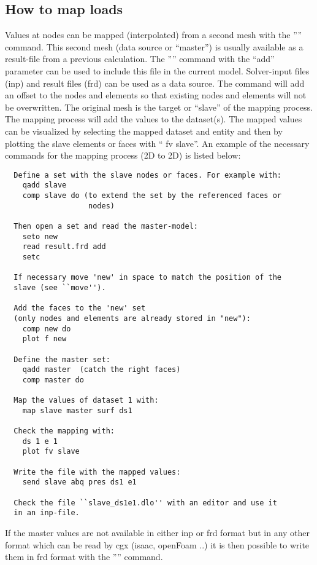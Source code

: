 \documentclass{article}
\begin{document}
\begin{appendix}
\subsection{\label{How to map loads}How to map loads}
Values at nodes can be mapped (interpolated) from a second mesh with the '''' command. This second mesh (data source or ``master'') is usually available as a result-file from a previous calculation. The '''' command with the ``add'' parameter can be used to include this file in the current model. Solver-input files (inp) and result files (frd) can be used as a data source. The command will add an offset to the nodes and elements so that existing nodes and elements will not be overwritten. The original mesh is the target or ``slave'' of the mapping process. The mapping process will add the values to the dataset(s). The mapped values can be visualized by selecting the mapped dataset and entity and then by plotting the slave elements or faces with `` fv slave''. An example of the necessary commands for the mapping process (2D to 2D) is listed below:
\begin{verbatim}
  Define a set with the slave nodes or faces. For example with:
    qadd slave
    comp slave do (to extend the set by the referenced faces or
                   nodes)

  Then open a set and read the master-model:
    seto new
    read result.frd add
    setc

  If necessary move 'new' in space to match the position of the
  slave (see ``move'').

  Add the faces to the 'new' set
  (only nodes and elements are already stored in "new"):
    comp new do
    plot f new

  Define the master set:
    qadd master  (catch the right faces)
    comp master do

  Map the values of dataset 1 with:
    map slave master surf ds1

  Check the mapping with:
    ds 1 e 1
    plot fv slave

  Write the file with the mapped values:
    send slave abq pres ds1 e1

  Check the file ``slave_ds1e1.dlo'' with an editor and use it
  in an inp-file.
\end{verbatim}
If the master values are not available in either inp or frd format but in any other format which can be read by cgx (isaac, openFoam ..) it is then possible to write them in frd format with the '''' command.



\end{appendix}
\end{document}
